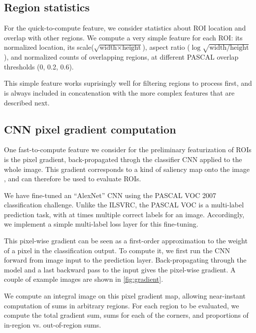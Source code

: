 \subsection{Region statistics}\label{sec:region}
For the quick-to-compute feature, we consider statistics about ROI location and overlap with other regions.
We compute a very simple feature for each ROI: its normalized location,
its scale($\sqrt{\text{width} \times \text{height}}$),
aspect ratio ($\log \sqrt{\text{width} / \text{height}}$),
and normalized counts of overlapping regions, at different PASCAL overlap  thresholds (0, 0.2, 0.6).

This simple feature works suprisingly well for filtering regions to process first, and is always included in concatenation with the more complex features that are described next.

\subsection{CNN pixel gradient computation}\label{sec:gradient}

One fast-to-compute feature we consider for the preliminary featurization of ROIs is the pixel gradient, back-propagated throgh the classifier CNN applied to the whole image.
This gradient corresponds to a kind of saliency map onto the image \cite{Simonyan-ICLR-2014}, and can therefore be used to evaluate ROIs.

We have fine-tuned an ``AlexNet'' \cite{Krizhevsky-NIPS-2012} CNN using the PASCAL VOC 2007 classification challenge.
Unlike the ILSVRC, the PASCAL VOC is a multi-label prediction task, with at times multiple correct labels for an image.
Accordingly, we implement a simple multi-label loss layer for this fine-tuning.

This pixel-wise gradient can be seen as a first-order approximation to the weight of a pixel in the classification output.
To compute it, we first run the CNN forward from image input to the prediction layer.
Back-propagating through the model and a last backward pass to the input gives the pixel-wise gradient.
A couple of example images are shown in \autoref{fig:gradient}.

We compute an integral image on this pixel gradient map, allowing near-instant computation of sums in arbitrary regions.
For each region to be evaluated, we compute the total gradient sum, sums for each of the corners, and proportions of in-region vs. out-of-region sums.


